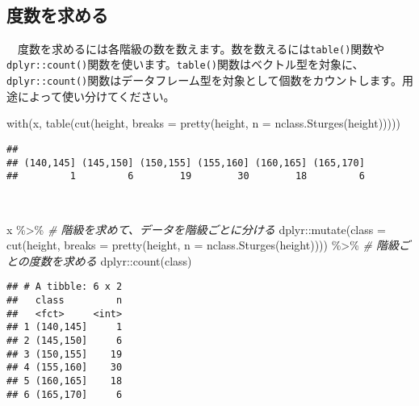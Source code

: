 \documentclass[
  12pt,
]{book}
\newenvironment{Shaded}{\begin{snugshade}}{\end{snugshade}}
\newcommand{\AttributeTok}[1]{\textcolor[rgb]{0.77,0.63,0.00}{#1}}
\newcommand{\CommentTok}[1]{\textcolor[rgb]{0.56,0.35,0.01}{\textit{#1}}}
\newcommand{\FunctionTok}[1]{\textcolor[rgb]{0.00,0.00,0.00}{#1}}
\newcommand{\NormalTok}[1]{#1}
\newcommand{\SpecialCharTok}[1]{\textcolor[rgb]{0.00,0.00,0.00}{#1}}
\begin{document}
　

\hypertarget{ux5ea6ux6570ux3092ux6c42ux3081ux308b}{%
\subsection{度数を求める}\label{ux5ea6ux6570ux3092ux6c42ux3081ux308b}}

　度数を求めるには各階級の数を数えます。数を数えるには\texttt{table()}関数や\texttt{dplyr::count()}関数を使います。\texttt{table()}関数はベクトル型を対象に、\texttt{dplyr::count()}関数はデータフレーム型を対象として個数をカウントします。用途によって使い分けてください。

\begin{Shaded}
\begin{Highlighting}[]
\FunctionTok{with}\NormalTok{(x, }\FunctionTok{table}\NormalTok{(}\FunctionTok{cut}\NormalTok{(height, }\AttributeTok{breaks =} \FunctionTok{pretty}\NormalTok{(height, }\AttributeTok{n =} \FunctionTok{nclass.Sturges}\NormalTok{(height)))))}
\end{Highlighting}
\end{Shaded}

\begin{verbatim}
## 
## (140,145] (145,150] (150,155] (155,160] (160,165] (165,170] 
##         1         6        19        30        18         6
\end{verbatim}

　

\begin{Shaded}
\begin{Highlighting}[]
\NormalTok{x }\SpecialCharTok{\%\textgreater{}\%} 
  \CommentTok{\# 階級を求めて、データを階級ごとに分ける}
\NormalTok{  dplyr}\SpecialCharTok{::}\FunctionTok{mutate}\NormalTok{(}\AttributeTok{class =} \FunctionTok{cut}\NormalTok{(height,}
                            \AttributeTok{breaks =} \FunctionTok{pretty}\NormalTok{(height, }\AttributeTok{n =} \FunctionTok{nclass.Sturges}\NormalTok{(height)))) }\SpecialCharTok{\%\textgreater{}\%} 
  \CommentTok{\# 階級ごとの度数を求める}
\NormalTok{  dplyr}\SpecialCharTok{::}\FunctionTok{count}\NormalTok{(class)}
\end{Highlighting}
\end{Shaded}

\begin{verbatim}
## # A tibble: 6 x 2
##   class         n
##   <fct>     <int>
## 1 (140,145]     1
## 2 (145,150]     6
## 3 (150,155]    19
## 4 (155,160]    30
## 5 (160,165]    18
## 6 (165,170]     6
\end{verbatim}
\end{document}
